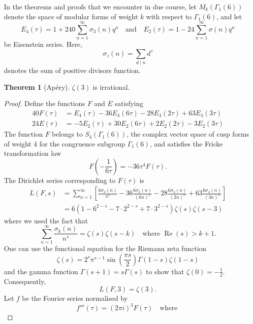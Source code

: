 \documentclass[12pt, a4paper]{amsart}
\theoremstyle{definition}
\newtheorem{theorem}{Theorem}[section]
\numberwithin{theorem}{section}
\begin{document}
In the theorems and proofs that we encounter in due course, let $M_k\left(\Gamma_1\left(6\right)\right)$ denote the space of modular forms of weight $k$ with respect to $\Gamma_1\left(6\right)$, and let \[E_4\left(\tau\right)=1+240\sum_{n=1}^{\infty}\sigma_3\left(n\right)q^n\quad\text{and}\quad E_2\left(\tau\right)=1-24\sum_{n=1}^{\infty}\sigma\left(n\right)q^n\]
be Eisenstein series. Here, \[\sigma_z\left(n\right)=\sum_{d\mid n}d^z\]
denotes the sum of positive divisors function.
\begin{theorem}[Apéry]
$\zeta\left(3\right)$ is irrational.
\end{theorem}
\begin{proof}
Define the functions $F$ and $E$ satisfying \begin{align*}
    40F\left(\tau\right)&=E_4\left(\tau\right)-36E_4\left(6\tau\right)-28E_4\left(2\tau\right)+63E_4\left(3\tau\right)\\
    24E\left(\tau\right)&=-5E_2\left(\tau\right)+30E_2\left(6\tau\right)+2E_2\left(2\tau\right)-3E_2\left(3\tau\right)
\end{align*}
The function \(F\) belongs to \(S_4\left(\Gamma_1\left(6\right)\right)\), the complex vector space of cusp forms of weight 4 for the congruence subgroup $\Gamma_1\left(6\right)$, and satisfies the Fricke transformation law
\[F\left(-\frac{1}{6\tau}\right)=-36\tau^4F\left(\tau\right).\]
The Dirichlet series corresponding to $F\left(\tau\right)$ is \begin{align*}
L\left(F,s\right)&=\sum_{n=1}^{\infty}\left[\frac{6\sigma_3\left(n\right)}{n^s}-36\frac{6\sigma_3\left(n\right)}{\left(6n\right)^s}-28\frac{6\sigma_3\left(n\right)}{\left(2n\right)^s}+63\frac{6\sigma_3\left(n\right)}{\left(3n\right)^s}\right]\\
&=6\left(1-6^{2-s}-7\cdot 2^{2-s}+7\cdot 3^{2-s}\right)\zeta\left(s\right)\zeta\left(s-3\right)
\end{align*}
where we used the fact that \[\sum_{n=1}^{\infty}\frac{\sigma_k\left(n\right)}{n^s}=\zeta\left(s\right)\zeta\left(s-k\right)\quad\text{where }\operatorname{Re}\left(s\right)>k+1.\]
One can use the functional equation for the Riemann zeta function \[\zeta\left(s\right)=2^s\pi^{s-1}\sin \left(\frac{\pi s}{2}\right)\Gamma\left(1-s\right)\zeta\left(1-s\right)\]
and the gamma function $\Gamma\left(s+1\right)=s\Gamma\left(s\right)$ to show that $\zeta\left(0\right)=-\frac{1}{2}$. Consequently, \[L\left(F,3\right)=\zeta\left(3\right).\]
Let \(f\) be the Fourier series normalised by
\[f'''\left(\tau\right)=\left(2\pi i\right)^3F\left(\tau\right)\quad\text{where }
\]
\end{proof}
\end{document}
